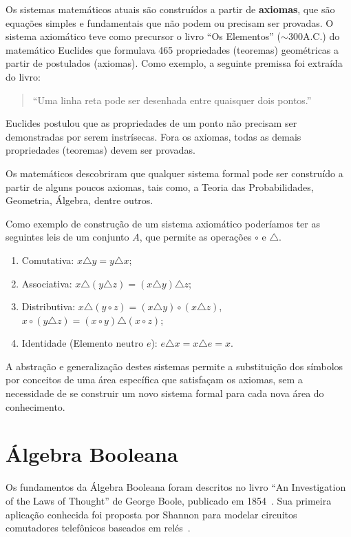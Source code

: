 Os sistemas matemáticos atuais são construídos a partir de {\bf
  axiomas}, que são equações simples e fundamentais que não podem ou
precisam ser provadas. O sistema axiomático teve como precursor o
livro ``Os Elementos'' ($\sim300$A.C.) do matemático Euclides que
formulava 465 propriedades (teoremas) geométricas a partir de
postulados (axiomas).  Como exemplo, a seguinte premissa foi extraída
do livro:

\begin{quote}
``Uma linha reta pode ser desenhada entre quaisquer dois pontos.''
\end{quote}

Euclides postulou que as propriedades de um ponto não precisam ser
demonstradas por serem instrísecas. Fora os axiomas, todas as demais
propriedades (teoremas) devem ser provadas.

Os matemáticos descobriram que qualquer sistema formal pode ser
construído a partir de alguns poucos axiomas, tais como, a Teoria das
Probabilidades, Geometria, Álgebra, dentre outros.

Como exemplo de construção de um sistema axiomático poderíamos ter as
seguintes leis de um conjunto $A$, que permite as operações $\circ$ e
$\triangle$.

\begin{enumerate}
\item Comutativa: $x\triangle y=y\triangle x$;
\item Associativa: $x\triangle (y\triangle z)= (x\triangle y)\triangle z$;
\item Distributiva: $x\triangle (y\circ z) = (x\triangle y)\circ (x\triangle z)$,\quad
  $x\circ (y\triangle z) = (x\circ y)\triangle (x\circ z)$;
\item Identidade (Elemento neutro $e$): $e\triangle x=x\triangle e=x$.
\end{enumerate}

A abstração e generalização destes sistemas permite a substituição dos
símbolos por conceitos de uma área específica que satisfaçam os
axiomas, sem a necessidade de se construir um novo sistema formal para
cada nova área do conhecimento.

\section{Álgebra Booleana}

Os fundamentos da Álgebra Booleana foram descritos no livro ``An
Investigation of the Laws of Thought'' de George Boole, publicado em
1854~\cite{boole1854}. Sua primeira aplicação conhecida foi proposta
por Shannon para modelar circuitos comutadores telefônicos baseados em
relés~\cite{shannon1937}.

